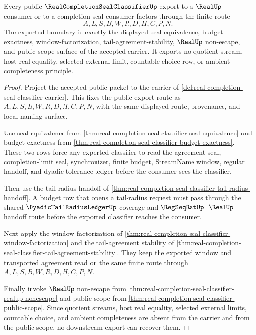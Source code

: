 \begin{theorem}
\label{thm:real-completion-seal-classifier-public-export}
Every public $\RealCompletionSealClassifierUp$ export to a $\RealUp$ consumer or to a completion-seal consumer factors through the finite route
$$
A,L,S,B,W,R,D,H,C,P,N.
$$
The exported boundary is exactly the displayed seal-equivalence, budget-exactness, window-factorization, tail-agreement-stability, $\RealUp$ non-escape, and public-scope surface of the accepted carrier. It exports no quotient stream, host real equality, selected external limit, countable-choice row, or ambient completeness principle.
\end{theorem}
\begin{proof}
Project the accepted public packet to the carrier of \autoref{def:real-completion-seal-classifier-carrier}. This fixes the public export route as $A,L,S,B,W,R,D,H,C,P,N$, with the same displayed route, provenance, and local naming surface.

Use seal equivalence from \autoref{thm:real-completion-seal-classifier-seal-equivalence} and budget exactness from \autoref{thm:real-completion-seal-classifier-budget-exactness}. These two rows force any exported classifier to read the agreement seal, completion-limit seal, synchronizer, finite budget, StreamName window, regular handoff, and dyadic tolerance ledger before the consumer sees the classifier.

Then use the tail-radius handoff of \autoref{thm:real-completion-seal-classifier-tail-radius-handoff}. A budget row that opens a tail-radius request must pass through the shared $\DyadicTailRadiusLedgerUp$ coverage and $\RegSeqRatUp$--$\RealUp$ handoff route before the exported classifier reaches the consumer.

Next apply the window factorization of \autoref{thm:real-completion-seal-classifier-window-factorization} and the tail-agreement stability of \autoref{thm:real-completion-seal-classifier-tail-agreement-stability}. They keep the exported window and transported agreement read on the same finite route through $A,L,S,B,W,R,D,H,C,P,N$.

Finally invoke $\RealUp$ non-escape from \autoref{thm:real-completion-seal-classifier-realup-nonescape} and public scope from \autoref{thm:real-completion-seal-classifier-public-scope}. Since quotient streams, host real equality, selected external limits, countable choice, and ambient completeness are absent from the carrier and from the public scope, no downstream export can recover them.
\end{proof}

